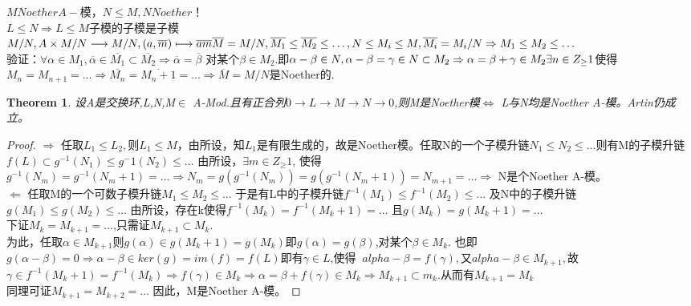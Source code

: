 \documentclass[UTF8]{article}
\newtheorem{thm}{Theorem}[section]
\begin{document}
$M Noether A-$模，$N\leq M,N Noether$！\\
$L\leq N\Rightarrow L\leq M$子模的子模是子模\\
$M/N,A\times M/N\longrightarrow M/N,(a,\overline{m})\longmapsto \overline{am}\\
\overline{M}=M/N,\overline{M_1}\leq\overline{M_2}\leq\ldots,N\leq M_i\leq M,\overline{M_i}=M_i/N\\
\Rightarrow M_1\leq M_2\leq\ldots$\\
验证：$\forall\alpha\in M_1,\overline{\alpha}\in\overline{M_1}\subset\overline{M_2}\Rightarrow\overline{\alpha}=\overline{\beta}$ 对某个$\beta\in M_2$.即$\alpha-\beta\in N,\alpha-\beta=\gamma\in N\subset M_2\Rightarrow\alpha=\beta+\gamma\in M_2\\
\exists n\in Z_\geq1$使得$M_n=M_{n+1}=\ldots\Rightarrow\overline{M_n}=\overline{M_n+1}=\ldots\Rightarrow\overline{M}=M/N$是Noether的.\\
\begin{thm}
	设A是交换环,L,N,M$\in$ A-Mod.且有正合列$0\longrightarrow L\longrightarrow M\longrightarrow N\longrightarrow0$,则M是Noether模$\Leftrightarrow$ L与N均是Noether A-模。Artin仍成立。
\end{thm}
\begin{proof}
	$\Rightarrow$ 任取$L_1\leq L_2,$则$L_1\leq M$，由所设，知$L_1$是有限生成的，故是Noether模。任取N的一个子模升链$N_1\leq N_2\leq\ldots$则有M的子模升链$f(L)\subset g^{-1}(N_1)\leq g^-1(N_2)\leq\ldots$ 由所设，$\exists m\in Z_\geq1$, 使得$g^{-1}(N_m)=g^{-1}(N_m+1)=\ldots\Rightarrow N_m=g(g^{-1}(N_m))=g(g^{-1}(N_m+1))=N_{m+1}=\ldots\Rightarrow$ N是个Noether A-模。\\
	$\Leftarrow$ 任取M的一个可数子模升链$M_1\leq M_2\leq\ldots$ 于是有L中的子模升链$f^{-1}(M_1)\leq f^{-1}(M_2)\leq\ldots$ 及N中的子模升链$g(M_1)\leq g(M_2)\leq\ldots$ 由所设，存在k使得$f^{-1}(M_k)=f^{-1}(M_k+1)=\ldots$ 且$g(M_k)=g(M_k+1)=\ldots$\\
	下证$M_k=M_{k+1}=\ldots$,只需证$M_{k+1}\subset M_k$.\\
	为此，任取$\alpha\in M_{k+1}$则$g(\alpha)\in g(M_k+1)=g(M_k)$即$g(\alpha)=g(\beta)$,对某个$\beta\in M_k$. 也即$g(\alpha-\beta)=0\Rightarrow \alpha-\beta\in ker(g)=im(f)=f(L)$即有$\gamma\in L$,使得
	$\ alpha-\beta=f(\gamma),$又$alpha-\beta\in M_{k+1},$故$\gamma\in f^{-1}(M_k+1)=f^{-1}(M_k)\Rightarrow f(\gamma)\in M_k\Rightarrow\alpha=\beta+f(\gamma)\in M_k\Rightarrow M_{k+1}\subset m_k.$从而有$M_{k+1}=M_{k}$\\
	同理可证$M_{k+1}=M_{k+2}=\ldots$ 因此，M是Noether A-模。
\end{proof}
\end{document}
